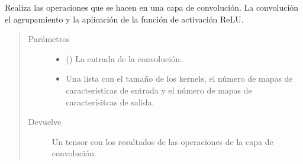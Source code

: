 \begin{fulllineitems}
\label{\detokenize{model_desc:cnn_indoor_classifier_model.convolutional_layer}}
Realiza las operaciones que se hacen en una capa
de convolución. La convolución el agrupamiento
y la aplicación de la función de activación ReLU.
\begin{quote}\begin{description}
\item[{Parámetros}] \leavevmode\begin{itemize}
\item {} 
 () \textendash{} La entrada de la convolución.

\item {} 
 \textendash{} Una lista con el tamaño de los kernels, el número de mapas de características de entrada y el número de mapas de caracterísitcas de salida.

\end{itemize}

\item[{Devuelve}] \leavevmode
Un tensor con los resultados de las operaciones de la capa de convolución.

\end{description}\end{quote}

\end{fulllineitems}


